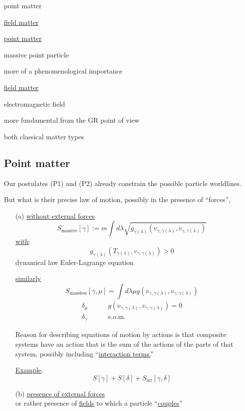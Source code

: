 \documentclass[10pt]{amsart}
\begin{document}
\begin{multicols*}{2}
	point matter
	
	\underline{field matter}
	
	\underline{point matter}
	
	massive point particle 
	
	more of a phenomenological importance
	
	\underline{field matter}
	
	electromagnetic field
	
	more fundamental from the GR point of view
	
	
	both classical matter types
	
	
	\subsection{Point matter}
	
	Our postulates (P1) and (P2) already constrain the possible particle worldlines.  
	
	But what is their precise law of motion, possibly in the presence of ``forces'',
	
	\begin{enumerate}
		\item[(a)] \underline{without external forces}
		\[
		S_{\text{massive}}[\gamma] := m \int d\lambda \sqrt{ g_{\gamma(\lambda)}( v_{\gamma,\gamma(\lambda)} , v_{\gamma,\gamma(\lambda) } ) }
		\]
		\underline{with}:
		\[
		g_{\gamma(\lambda)}(T_{\gamma(\lambda)}, v_{\gamma, \gamma(\lambda) } ) > 0 
		\]
		dynamical law Euler-Lagrange equation
		
		\underline{similarly}
		\[
		S_{\text{massless}}[\gamma,\mu] = \int d\lambda \mu g(v_{\gamma, \gamma(\lambda)} , v_{\gamma,\gamma(\lambda)} )
		\]
		\[
		\begin{aligned}
		\delta_{\mu}  \quad \quad \, & g(v_{\gamma,\gamma(\lambda)}, v_{\gamma,\gamma(\lambda) } ) = 0 \\
		\delta_{\gamma} \quad \quad \, & \text{e.o.m.}
		\end{aligned}
		\]
		
		Reason for describing equations of motion by actions is that composite systems have an action that is the sum of the actions of the parts of that system, possibly including ``\underline{interaction terms.}''
		
		\underline{Example}. \[
		S[\gamma] + S[\delta] + S_{\text{int}}[\gamma,\delta]
		\]
		\item[(b)] \underline{presence of external forces} \\
		or rather presence of \underline{fields} to which a particle ``\underline{couples}''
		

\end{enumerate}
\end{multicols*}
\end{document}
